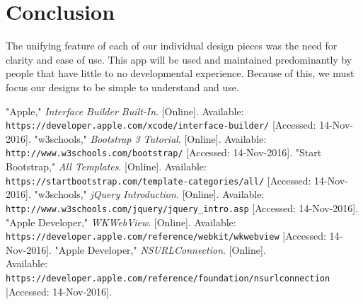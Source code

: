 \documentclass[letterpaper, 10pt,titlepage]{article}
\begin{document}
\section{Conclusion}
The unifying feature of each of our individual design pieces was the need for clarity and ease of use. This app will be used and maintained predominantly by people that have little to no developmental experience. Because of this, we must focus our designs to be simple to understand and use. 









































\newpage %
\begin{thebibliography}{9}

"Apple," \textit{Interface Builder Built-In}. [Online]. Available:
\texttt{https://developer.apple.com/xcode/interface-builder/} [Accessed: 14-Nov-2016].
"w3schools," \textit{Bootstrap 3 Tutorial}. [Online]. Available:
\texttt{http://www.w3schools.com/bootstrap/} [Accessed: 14-Nov-2016].
"Start Bootstrap," \textit{All Templates}. [Online]. Available:
\texttt{https://startbootstrap.com/template-categories/all/} [Accessed: 14-Nov-2016].
"w3schools," \textit{jQuery Introduction}. [Online]. Available:
\texttt{http://www.w3schools.com/jquery/jquery\_intro.asp} [Accessed: 14-Nov-2016].
"Apple Developer," \textit{WKWebView}. [Online]. Available:
\texttt{https://developer.apple.com/reference/webkit/wkwebview} [Accessed: 14-Nov-2016].
"Apple Developer," \textit{NSURLConnection}. [Online]. 
\\Available: \texttt{https://developer.apple.com/reference/foundation/nsurlconnection} [Accessed: 14-Nov-2016].














\end{thebibliography}
\end{document}

